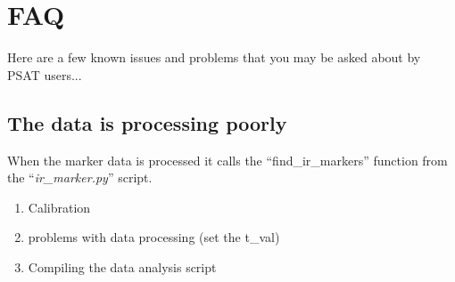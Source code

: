 \documentclass[12pt,a4paper]{report}
\begin{document}
	
	\section{FAQ}
	
	Here are a few known issues and problems that you may be asked about by PSAT users...
	
	\subsection{The data is processing poorly}
		When the marker data is processed it calls the ``find_ir_markers'' function from the ``\textit{ir_marker.py}'' script. 
	
	\begin{enumerate}
		\item Calibration
		\item problems with data processing (set the t\_val)
		\item Compiling the data analysis script
		
	\end{enumerate}
	
	
	
	
	
\end{document}
